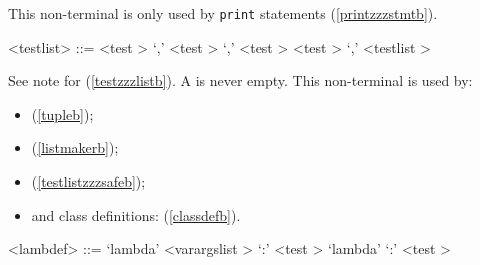 
This non-terminal is only used by \verb|print| statements (\ref{printzzzstmtb}).

\label{testlistb}

\begin{grammar}
<testlist> ::= <test \myref[testb]> `,'
	\alt <test \myref[testb]> `,' <test \myref[testb]>
	\alt <test \myref[testb]> `,' <testlist \myref[testlistb]>
\end{grammar}


See note for  (\ref{testzzzlistb}).  A  is never empty.
This non-terminal is used by:

\begin{itemize}
\item {} (\ref{tupleb});
\item {} (\ref{listmakerb});
\item {} (\ref{testlistzzzsafeb});
\item and class definitions:  (\ref{classdefb}).
\end{itemize} 

\label{lambdefb}

\begin{grammar}
<lambdef> ::= `lambda' <varargslist \myref[varargslistb]> `:' <test \myref[testb]>
	\alt `lambda' `:' <test \myref[testb]>
\end{grammar}

